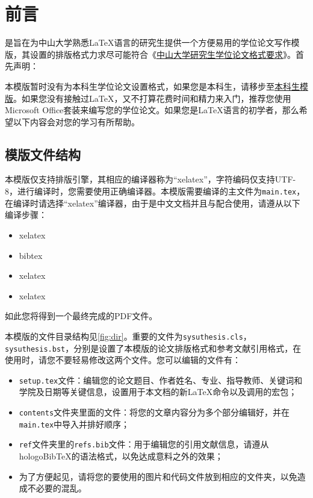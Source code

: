 \chapter{前言}


\sysuthesis{}是旨在为中山大学熟悉\LaTeX{}语言的研究生提供一个方便易用的学位论文写作模版，其设置的排版格式力求尽可能符合《\href{https://sysgraduate.sysu.edu.cn/sites/graduate.prod.dpcms4.sysu.edu.cn/files/2019-04/%E4%B8%AD%E5%B1%B1%E5%A4%A7%E5%AD%A6%E7%A0%94%E7%A9%B6%E7%94%9F%E5%AD%A6%E4%BD%8D%E8%AE%BA%E6%96%87%E6%A0%BC%E5%BC%8F%E8%A6%81%E6%B1%82.pdf}{中山大学研究生学位论文格式要求}》。首先声明：

本模版暂时没有为本科生学位论文设置格式，如果您是本科生，请移步至\href{https://github.com/SYSU-SCC/sysu-thesis}{本科生模版}。如果您没有接触过\LaTeX{}，又不打算花费时间和精力来入门，推荐您使用Microsoft Office套装来编写您的学位论文。如果您是\LaTeX{}语言的初学者，那么希望以下内容会对您的学习有所帮助。

\section{模版文件结构}

本模版仅支持排版引擎，其相应的编译器称为“xelatex”，字符编码仅支持UTF-8，进行编译时，您需要使用正确编译器。本模版需要编译的主文件为\texttt{main.tex}，在编译时请选择“xelatex”编译器，由于是中文文档并且与配合使用，请遵从以下编译步骤：
\begin{itemize}
    \item xelatex
    \item bibtex
    \item xelatex
    \item xelatex
\end{itemize}
如此您将得到一个最终完成的PDF文件。

本模版的文件目录结构见\ref{fig:dir}。重要的文件为\texttt{sysuthesis.cls}，\texttt{sysuthesis.bst}，分别是设置了本模版的论文排版格式和参考文献引用格式，在使用时，请您不要轻易修改这两个文件。您可以编辑的文件有：
\begin{itemize}
    \item \texttt{setup.tex}文件：编辑您的论文题目、作者姓名、专业、指导教师、关键词和学院及日期等关键信息，设置用于本文档的新\LaTeX{}命令以及调用的宏包；
    \item \texttt{contents}文件夹里面的文件：将您的文章内容分为多个部分编辑好，并在\texttt{main.tex}中导入并排好顺序；
    \item \texttt{ref}文件夹里的\texttt{refs.bib}文件：用于编辑您的引用文献信息，请遵从hologo{BibTeX}的语法格式，以免达成意料之外的效果；
    \item 为了方便起见，请将您的要使用的图片和代码文件放到相应的文件夹，以免造成不必要的混乱。
\end{itemize}

